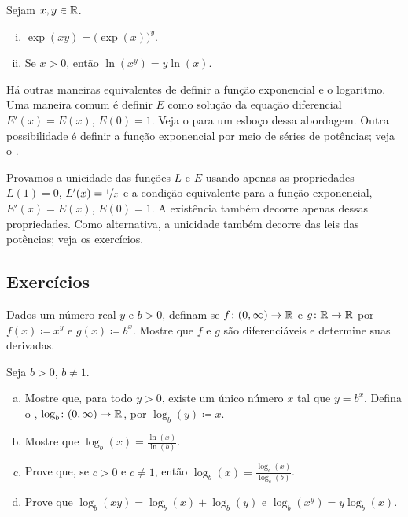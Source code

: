 \begin{prop}
Sejam $x, y \in {\mathbb{R}}$.
\begin{enumerate}[(i)]
\item
$\exp(xy) = {\bigl(\exp(x)\bigr)}^y$.
\item
Se $x > 0$, então $\ln(x^y) = y \ln (x)$.
\end{enumerate}
\end{prop}

\begin{remark}
Há outras maneiras equivalentes de definir a função exponencial e o logaritmo.
Uma maneira comum é definir $E$ como solução da equação diferencial
$E'(x) = E(x)$, $E(0) = 1$. Veja o 
para um esboço dessa abordagem. Outra possibilidade
é definir a função exponencial por meio de séries de potências; veja o
.
\end{remark}

\begin{remark}
Provamos a unicidade das funções $L$ e $E$ usando apenas as propriedades
$L(1)=0$, $L'(x) = \nicefrac{1}{x}$
e a condição equivalente para a função exponencial,
$E'(x) = E(x)$, $E(0) = 1$. A existência também decorre
apenas dessas propriedades.
Como alternativa, a unicidade também decorre
das leis das potências; veja os exercícios.
\end{remark}

\subsection{Exercícios}

\begin{exercise}
Dados um número real $y$ e $b > 0$, definam-se $f \colon (0,\infty) \to {\mathbb{R}}$
e $g \colon {\mathbb{R}} \to {\mathbb{R}}$ por $f(x) \coloneqq x^y$ e $g(x) \coloneqq b^x$.
Mostre que $f$ e $g$ são diferenciáveis e determine suas derivadas.
\end{exercise}

\begin{samepage}
\begin{exercise} \label{exercise:otherlogbases}
Seja $b > 0$, $b\neq 1$.
\begin{enumerate}[a)]
\item
Mostre que, para todo $y > 0$, existe um único número $x$
tal que $y = b^x$. Defina o \emph{},
$\log_b \colon (0,\infty) \to {\mathbb{R}}$, por
$\log_b(y) \coloneqq x$.
\item
Mostre que $\log_b(x) = \frac{\ln(x)}{\ln(b)}$.
\item
Prove que, se $c > 0$ e $c \neq 1$, então
$\log_b(x) = \frac{\log_c(x)}{\log_c(b)}$.
\item
Prove que $\log_b(xy) =
\log_b(x)+\log_b(y)$ e $\log_b(x^y) = y \log_b(x)$.
\end{enumerate}
\end{exercise}
\end{samepage}

